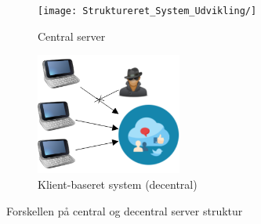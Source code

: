 \documentclass[11pt]{article}
\begin{document}
    \begin{figure}[H]
    \begin{subfigure}{0.5\textwidth}
        \centering
        \texttt{[image: Struktureret\_System\_Udvikling/]} 
        \caption{Central server}
        \label{fig:central_server}
    \end{subfigure}
    \begin{subfigure}{0.5\textwidth}
        \centering
        \includegraphics[width=0.7\linewidth, height=4cm]{Projectdoc/Assets/Illustrationer/Security_diagram_2.png}
        \caption{Klient-baseret system (decentral)}
        \label{fig:decentral_server}
    \end{subfigure}
    \caption{Forskellen på central og decentral server struktur}
    \label{fig:serverstruktur}
\end{figure}
    
    
    
    \noindent
    
    
\end{document}
